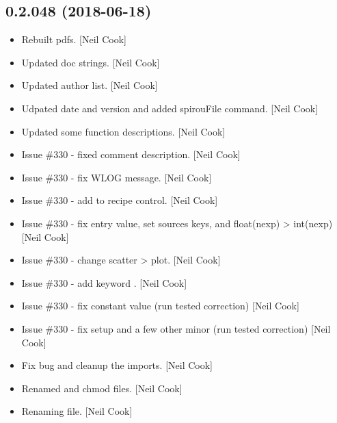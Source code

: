 \documentclass[a4paper,10pt,english]{report}
\begin{document}
\subsection{0.2.048 (2018-06-18)}
\label{\detokenize{misc/changelog:id417}}\begin{itemize}
\item {} 
Rebuilt pdfs. {[}Neil Cook{]}

\item {} 
Updated doc strings. {[}Neil Cook{]}

\item {} 
Updated author list. {[}Neil Cook{]}

\item {} 
Udpated date and version and added spirouFile command. {[}Neil Cook{]}

\item {} 
Updated some function descriptions. {[}Neil Cook{]}

\item {} 
Issue \#330 - fixed comment description. {[}Neil Cook{]}

\item {} 
Issue \#330 - fix WLOG message. {[}Neil Cook{]}

\item {} 
Issue \#330 - add  to recipe control. {[}Neil Cook{]}

\item {} 
Issue \#330 - fix entry value, set sources keys, and float(nexp) \textendash{}\textgreater{}
int(nexp) {[}Neil Cook{]}

\item {} 
Issue \#330 - change scatter \textendash{}\textgreater{} plot. {[}Neil Cook{]}

\item {} 
Issue \#330 - add keyword . {[}Neil Cook{]}

\item {} 
Issue \#330 - fix constant value (run tested correction) {[}Neil Cook{]}

\item {} 
Issue \#330 - fix setup and a few other minor (run tested correction)
{[}Neil Cook{]}

\item {} 
Fix bug and cleanup the imports. {[}Neil Cook{]}

\item {} 
Renamed and chmod files. {[}Neil Cook{]}

\item {} 
Renaming file. {[}Neil Cook{]}


\end{itemize}
\end{document}

